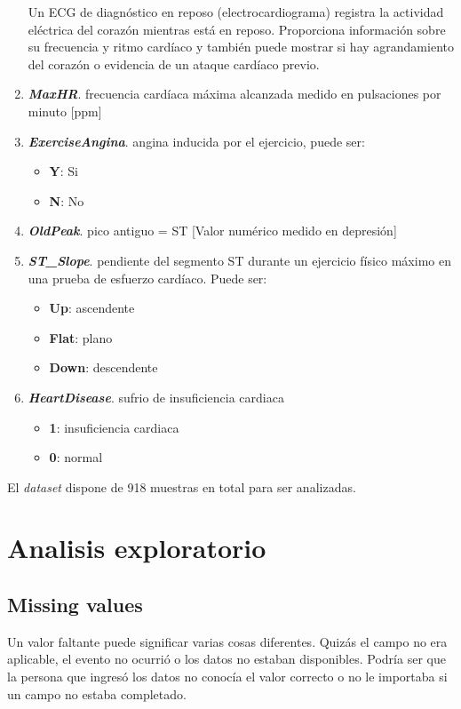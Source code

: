 \documentclass[12pt, letterpaper]{article}
\begin{document}
\begin{enumerate}
{    Un ECG de diagnóstico en reposo (electrocardiograma) registra la actividad eléctrica 
    del corazón mientras está en reposo. Proporciona información sobre su frecuencia y 
    ritmo cardíaco y también puede mostrar si hay agrandamiento del corazón o 
    evidencia de un ataque cardíaco previo. \cite{electrocardiograma}
    } 
    \item{\textbf{\textit{MaxHR}}. frecuencia cardíaca máxima alcanzada
    medido en pulsaciones por minuto [ppm]}
    \item{\textbf{\textit{ExerciseAngina}}. angina inducida por el ejercicio, puede ser:
    \begin{itemize}
        \item{\textbf{Y}}: Si
        \item{\textbf{N}}: No
    \end{itemize}
    }
    \item{\textbf{\textit{OldPeak}}. pico antiguo = ST [Valor numérico medido en depresión]}
    \item{\textbf{\textit{ST\_Slope}}. pendiente del segmento ST 
    durante un ejercicio físico máximo en una prueba de 
    esfuerzo cardíaco. Puede ser:
    \begin{itemize}
        \item{\textbf{Up}}: ascendente
        \item{\textbf{Flat}}: plano
        \item{\textbf{Down}}: descendente
    \end{itemize}
    }
    \item{\textbf{\textit{HeartDisease}}. sufrio de insuficiencia cardiaca
    \begin{itemize}
        \item{\textbf{1}}: insuficiencia cardiaca
        \item{\textbf{0}}: normal
    \end{itemize}
    }
\end{enumerate}
El \textit{dataset} dispone de 918 muestras en total para ser analizadas.

\section{Analisis exploratorio}
\subsection{Missing values}
Un valor faltante puede significar varias cosas diferentes. 
Quizás el campo no era aplicable, el evento no ocurrió o los datos no estaban disponibles. 
Podría ser que la persona que ingresó los datos no conocía el valor correcto o no le importaba 
si un campo no estaba completado. \cite{missin_values}
\end{document}
